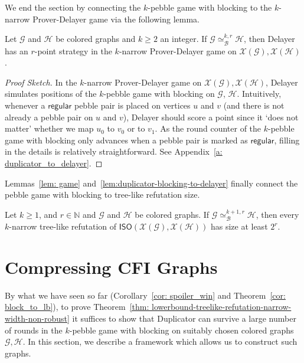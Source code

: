 \documentclass[a4paper,english, thm-restate]{lipics-v2021}
\newcommand{\regular}{\mathsf{regular}}
\newcommand{\graphG}{\mathcal{G}}
\newcommand{\graphH}{\mathcal{H}}
\newcommand{\graphXG}{\mathcal{X}(\mathcal{G})}
\newcommand{\graphXH}{\mathcal{X}(\mathcal{H})}
\newcommand{\XISO}{\mathsf{ISO}(\graphXG, \graphXH)}
\newcommand{\kbequivr}[2]{\simeq_{\mathcal{B}}^{#1,#2}}
\newcommand{\ifAppendix}[1]{#1}
\begin{document}
We end the section by connecting the $k$-pebble game with blocking to the $k$-narrow Prover-Delayer game via the following lemma.
%

\begin{lemma}
        \label{lem:duplicator-blocking-to-delayer}
        Let $\graphG$ and $\graphH$ be colored graphs
        and $k\geq 2$ an integer. If $\graphG \kbequivr{k}{r} \graphH$, then Delayer has an $r$-point strategy in the $k$-narrow Prover-Delayer game on $\graphXG, \graphXH$.
\end{lemma}

	\begin{proof}[Proof Sketch]
\noindent In the $k$-narrow Prover-Delayer game on $\graphXG,\graphXH$,
Delayer  
simulates positions of the $k$-pebble game with blocking on $\graphG$, $\graphH$.
Intuitively, whenever a $\regular$ pebble pair is placed on vertices $u$ and $v$
(and there is not already a pebble pair on $u$ and $v$),
Delayer should score a point 
%
since it `does not matter' whether we map $u_0$ to $v_0$ or to $v_1$. As the round counter of the $k$-pebble game with blocking only advances when a pebble pair is marked as $\regular$, filling in the details is relatively straightforward. \ifAppendix{See Appendix~\ref{a: duplicator_to_delayer}.}
\end{proof}

\noindent Lemmas~\ref{lem: game} and~\ref{lem:duplicator-blocking-to-delayer} finally connect the pebble game with blocking to tree-like refutation size. 


\begin{theorem} \label{cor: block_to_lb}
Let  $k \ge 1$, and $r \in \mathbb{N}$ and $\graphG$ and $\graphH$ be colored graphs.
If $\graphG \kbequivr{k+1}{r} \graphH$, then every $k$-narrow tree-like refutation of $\XISO$ has size at least $2^r$.
\end{theorem}

         
 \section{Compressing CFI Graphs}\label{sec:compressing-cfi}




By what we have seen so far (Corollary~\ref{cor: spoiler_win} and Theorem~\ref{cor: block_to_lb}), to prove Theorem~\ref{thm: lowerbound-treelike-refutation-narrow-width-non-robust} it suffices to show that Duplicator can survive a large number of rounds in the $k$-pebble game with blocking on suitably chosen colored graphs $\graphG, \graphH$. In this section, we describe a framework which allows us to construct such graphs.
\end{document}
